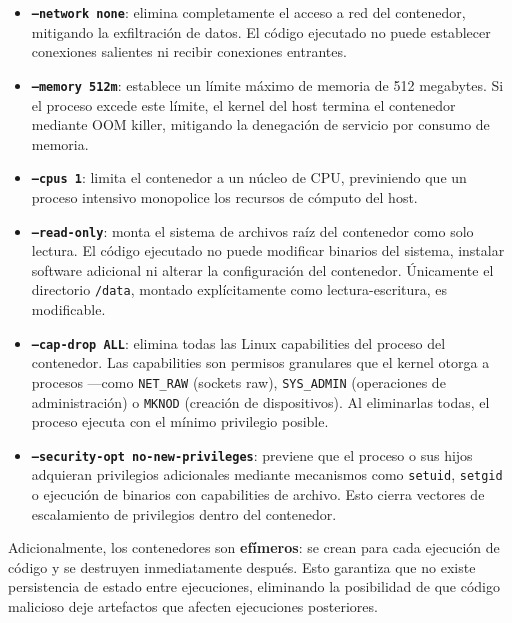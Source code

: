 \begin{itemize}
    \item \textbf{\texttt{--network none}}: elimina completamente el acceso a
    red del contenedor, mitigando la exfiltración de datos. El código
    ejecutado no puede establecer conexiones salientes ni recibir conexiones
    entrantes.

    \item \textbf{\texttt{--memory 512m}}: establece un límite máximo de
    memoria de 512 megabytes. Si el proceso excede este límite, el kernel
    del host termina el contenedor mediante OOM killer, mitigando la
    denegación de servicio por consumo de memoria.

    \item \textbf{\texttt{--cpus 1}}: limita el contenedor a un núcleo de CPU,
    previniendo que un proceso intensivo monopolice los recursos de cómputo
    del host.

    \item \textbf{\texttt{--read-only}}: monta el sistema de archivos raíz del
    contenedor como solo lectura. El código ejecutado no puede modificar
    binarios del sistema, instalar software adicional ni alterar la
    configuración del contenedor. Únicamente el directorio \texttt{/data},
    montado explícitamente como lectura-escritura, es modificable.

    \item \textbf{\texttt{--cap-drop ALL}}: elimina todas las Linux
    capabilities del proceso del contenedor. Las capabilities son permisos
    granulares que el kernel otorga a procesos ---como \texttt{NET\_RAW}
    (sockets raw), \texttt{SYS\_ADMIN} (operaciones de administración) o
    \texttt{MKNOD} (creación de dispositivos). Al eliminarlas todas, el
    proceso ejecuta con el mínimo privilegio posible.

    \item \textbf{\texttt{--security-opt no-new-privileges}}: previene que el
    proceso o sus hijos adquieran privilegios adicionales mediante mecanismos
    como \texttt{setuid}, \texttt{setgid} o ejecución de binarios con
    capabilities de archivo. Esto cierra vectores de escalamiento de
    privilegios dentro del contenedor.
\end{itemize}

Adicionalmente, los contenedores son \textbf{efímeros}: se crean para cada
ejecución de código y se destruyen inmediatamente después. Esto garantiza que
no existe persistencia de estado entre ejecuciones, eliminando la posibilidad
de que código malicioso deje artefactos que afecten ejecuciones posteriores.

